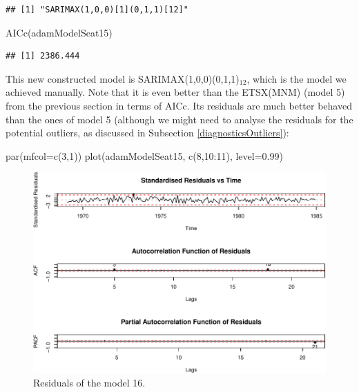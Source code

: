 \documentclass[
]{book}
\newenvironment{Shaded}{\begin{snugshade}}{\end{snugshade}}
\newcommand{\AttributeTok}[1]{\textcolor[rgb]{0.77,0.63,0.00}{#1}}
\newcommand{\DecValTok}[1]{\textcolor[rgb]{0.00,0.00,0.81}{#1}}
\newcommand{\FloatTok}[1]{\textcolor[rgb]{0.00,0.00,0.81}{#1}}
\newcommand{\FunctionTok}[1]{\textcolor[rgb]{0.00,0.00,0.00}{#1}}
\newcommand{\NormalTok}[1]{#1}
\newcommand{\SpecialCharTok}[1]{\textcolor[rgb]{0.00,0.00,0.00}{#1}}
\theoremstyle{definition}
\theoremstyle{definition}
\theoremstyle{definition}
\theoremstyle{definition}
\theoremstyle{remark}
\begin{document}
\begin{verbatim}
## [1] "SARIMAX(1,0,0)[1](0,1,1)[12]"
\end{verbatim}

\begin{Shaded}
\begin{Highlighting}[]
\FunctionTok{AICc}\NormalTok{(adamModelSeat15)}
\end{Highlighting}
\end{Shaded}

\begin{verbatim}
## [1] 2386.444
\end{verbatim}

This new constructed model is SARIMAX(1,0,0)(0,1,1)\(_{12}\), which is the model we achieved manually. Note that it is even better than the ETSX(MNM) (model 5) from the previous section in terms of AICc. Its residuals are much better behaved than the ones of model 5 (although we might need to analyse the residuals for the potential outliers, as discussed in Subsection \ref{diagnosticsOutliers}):

\begin{Shaded}
\begin{Highlighting}[]
\FunctionTok{par}\NormalTok{(}\AttributeTok{mfcol=}\FunctionTok{c}\NormalTok{(}\DecValTok{3}\NormalTok{,}\DecValTok{1}\NormalTok{))}
\FunctionTok{plot}\NormalTok{(adamModelSeat15, }\FunctionTok{c}\NormalTok{(}\DecValTok{8}\NormalTok{,}\DecValTok{10}\SpecialCharTok{:}\DecValTok{11}\NormalTok{), }\AttributeTok{level=}\FloatTok{0.99}\NormalTok{)}
\end{Highlighting}
\end{Shaded}

\begin{figure}
\centering
\includegraphics{Svetunkov--2022----ADAM_files/figure-latex/adamModelSeat16Resid-1.pdf}
\caption{\label{fig:adamModelSeat16Resid}Residuals of the model 16.}
\end{figure}
\end{document}
